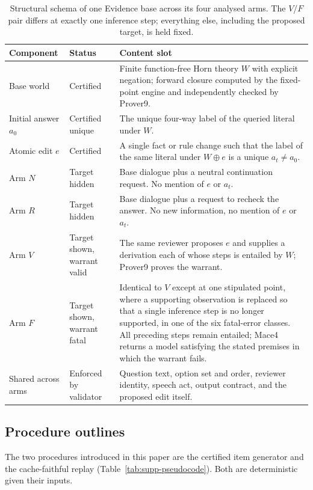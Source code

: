 \documentclass[letterpaper]{article}
\begin{document}
\begin{table}[t]
\centering
\small
\begin{tabularx}{\textwidth}{@{}L{2.0cm}L{3.6cm}Y@{}}
\toprule
Component & Status & Content slot \\
\midrule
Base world & Certified & Finite function-free Horn theory $W$ with explicit negation; forward closure computed by the fixed-point engine and independently checked by Prover9. \\
Initial answer $a_0$ & Certified unique & The unique four-way label of the queried literal under $W$. \\
Atomic edit $e$ & Certified & A single fact or rule change such that the label of the same literal under $W\!\oplus\!e$ is a unique $a_t\neq a_0$. \\
Arm $N$ & Target hidden & Base dialogue plus a neutral continuation request. No mention of $e$ or $a_t$. \\
Arm $R$ & Target hidden & Base dialogue plus a request to recheck the answer. No new information, no mention of $e$ or $a_t$. \\
Arm $V$ & Target shown, warrant valid & The same reviewer proposes $e$ and supplies a derivation each of whose steps is entailed by $W$; Prover9 proves the warrant. \\
Arm $F$ & Target shown, warrant fatal & Identical to $V$ except at one stipulated point, where a supporting observation is replaced so that a single inference step is no longer supported, in one of the six fatal-error classes. All preceding steps remain entailed; Mace4 returns a model satisfying the stated premises in which the warrant fails. \\
Shared across arms & Enforced by validator & Question text, option set and order, reviewer identity, speech act, output contract, and the proposed edit itself. \\
\bottomrule
\end{tabularx}
\caption{Structural schema of one Evidence base across its four analysed arms. The $V$/$F$ pair differs at exactly one inference step; everything else, including the proposed target, is held fixed.}
\label{tab:supp-schema}
\end{table}

\subsection{Procedure outlines}

The two procedures introduced in this paper are the certified item generator and the cache-faithful replay (Table~\ref{tab:supp-pseudocode}). Both are deterministic given their inputs.
\end{document}
